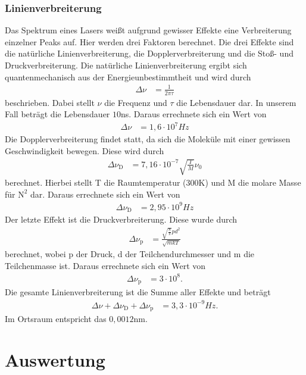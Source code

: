 \documentclass[
	a4paper,
	12pt,
	pagesize,
	ngerman
]{scrartcl}
\begin{document}
\subsubsection{Linienverbreiterung}
Das Spektrum eines Lasers weißt aufgrund gewisser Effekte eine Verbreiterung einzelner Peaks auf. Hier werden drei Faktoren berechnet. Die drei Effekte sind die natürliche Linienverbreiterung, die Dopplerverbreiterung und die Stoß- und Druckverbreiterung.
Die natürliche Linienverbreiterung ergibt sich quantenmechanisch aus der Energieunbestimmtheit und wird durch 
\begin{align}
\Delta\nu &= \frac{1}{2\pi\tau}
\end{align}
beschrieben. Dabei stellt $\nu$ die Frequenz und $\tau$ die Lebensdauer dar. In unserem Fall beträgt die Lebensdauer $10$ns.
Daraus errechnete sich ein Wert von 
\begin{align*}
\Delta\nu &= 1,6 \cdot 10^7 Hz
\end{align*}
Die Dopplerverbreiterung findet statt, da sich die Moleküle mit einer gewissen Geschwindigkeit bewegen. Diese wird durch 
\begin{align}
\Delta\nu_\text{D} &= 7,16 \cdot 10^{-7} \sqrt{\frac{T}{M}} \nu_0
\end{align}
berechnet. Hierbei stellt T die Raumtemperatur ($300$K)  und M die molare Masse für $\text{N}^2$ dar.
Daraus errechnete sich ein Wert von
\begin{align*}
\Delta\nu_\text{D} &= 2,95 \cdot 10^9 Hz
\end{align*}
Der letzte Effekt ist die Druckverbreiterung. Diese wurde durch 
\begin{align}
\Delta\nu_\text{p} &= \frac{\sqrt{\frac{8}{\pi}}pd^2}{\sqrt{mkT}}
\end{align}
berechnet, wobei p der Druck, d der Teilchendurchmesser und m die Teilchenmasse ist. Daraus errechnete sich ein Wert von
\begin{align*}
\Delta\nu_\text{p} &= 3 \cdot 10^8.
\end{align*}
Die gesamte Linienverbreiterung ist die Summe aller Effekte und beträgt
\begin{align*}
\Delta\nu + \Delta\nu_\text{D} +  \Delta\nu_\text{p} &= 3,3 \cdot 10^{-9}Hz.
\end{align*}
Im Ortsraum entspricht das $0,0012$nm.


\section{Auswertung}
\end{document}
